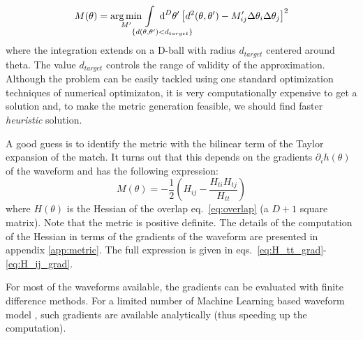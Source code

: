 \documentclass[twocolumn,showpacs,preprintnumbers,nofootinbib,prd,
superscriptaddress,10pt]{revtex4-2}
\newcommand{\dvol}[2]{\ensuremath{\operatorname{d}^{#2}\!{#1}}}
\DeclareMathOperator*{\argmin}{arg\,min}
\begin{document}
\begin{equation} \label{eq:metric_optmization}
	M(\theta) = \argmin_{M^\prime} \hspace{-4em} \int\limits_{\hspace{3em}\{d(\theta,\theta^\prime) < d_{target}\}} \hspace{-3.8em}
		\dvol{\theta^\prime}{D}  \left[ d^2(\theta,\theta^\prime) - M^\prime_{ij} \Delta\theta_i \Delta\theta_j
		\right]^2
\end{equation}
where the integration extends on a D-ball with radius $d_{target}$ centered around theta. The value $d_{target}$ controls the range of validity of the approximation.
Although the problem can be easily tackled using one standard optimization techniques of numerical optimizaton, it is very computationally expensive to get a solution and, to make the metric generation feasible, we should find faster {\it heuristic} solution.

A good guess is to identify the metric with the bilinear term of the Taylor expansion of the match.
It turns out that this depends on the gradients $\partial_i h(\theta)$ of the waveform and has the following expression:
\begin{equation}\label{eq:metric_expression}
	M(\theta) = - \frac{1}{2} \left( H_{ij} - \frac{H_{ti}H_{tj}}{H_{tt}} \right)
\end{equation}
where $H(\theta)$ is the Hessian of the overlap eq.~\eqref{eq:overlap} (a $D+1$ square matrix). Note that the metric is positive definite.
The details of the computation of the Hessian in terms of the gradients of the waveform are presented in appendix \ref{app:metric}.
The full expression is given in eqs.~\eqref{eq:H_tt_grad}-\eqref{eq:H_ij_grad}.

For most of the waveforms available, the gradients can be evaluated with finite difference methods. For a limited number of Machine Learning based waveform model \cite{something}, such gradients are available analytically (thus speeding up the computation).
\end{document}
